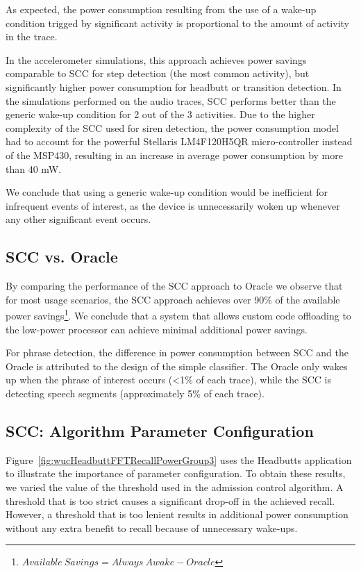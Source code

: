 As expected, the power consumption resulting from the use of a 
wake-up condition trigged by significant activity is 
proportional to the amount of activity in the trace.  

In the accelerometer simulations, this approach
achieves power savings comparable to SCC for step detection (the most
common activity), but significantly higher power consumption for
headbutt or transition detection.  In the simulations performed on 
the audio traces, SCC performs better than the generic wake-up 
condition for 2 out of the 3 activities.  Due to the higher complexity 
of the SCC used for siren detection, the power consumption model had
to account for the powerful Stellaris LM4F120H5QR micro-controller instead of
the MSP430, resulting in an increase in average power consumption by 
more than 40 mW.

We conclude that using a generic wake-up condition
would be inefficient for infrequent events of interest, as the device
is unnecessarily woken up whenever any other significant event occurs.


\subsection{SCC vs. Oracle}

By comparing the performance of the SCC approach to Oracle we
observe that for most usage scenarios, the SCC approach
achieves over 90\% of the available power
savings\footnote{$Available\:Savings=Always\:Awake - Oracle$}.
We conclude that a system that allows custom code offloading 
to the low-power processor can achieve minimal
additional power savings.

For phrase detection, the difference in power consumption between SCC and
the Oracle is attributed to the design of the simple classifier.  The Oracle 
only wakes up when the phrase of interest occurs (<1\% of each trace), while
the SCC is detecting speech segments (approximately 5\% of each trace).

\subsection{SCC: Algorithm Parameter Configuration}

Figure~\ref{fig:wucHeadbuttFFTRecallPowerGroup3} uses the Headbutts
application to illustrate the importance of parameter configuration.  
To obtain these results, we varied the value of the threshold used
in the admission control algorithm.  A threshold that is too strict 
causes a significant drop-off in the
achieved recall.  However, a threshold that is too lenient results in
additional power consumption without any extra benefit to recall
because of unnecessary wake-ups.



